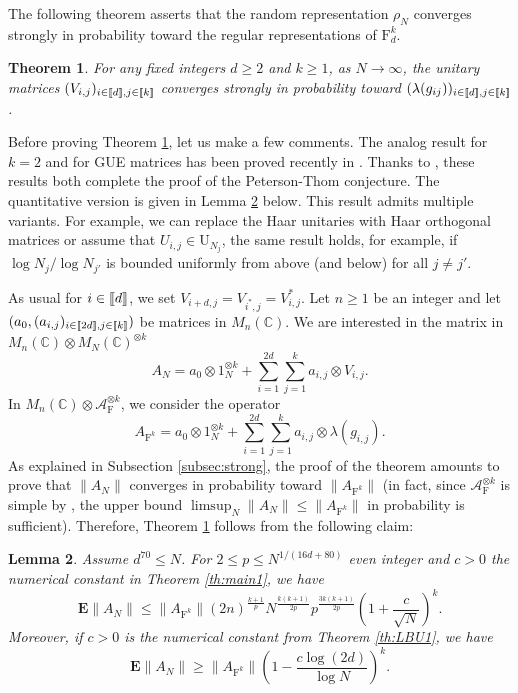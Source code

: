 \documentclass[11pt]{article}
\renewcommand{\star}{{\mathrm{F}}}
\newtheorem{lemma}{Lemma}[section]
\newtheorem{theorem}[lemma]{Theorem}
\newcommand{\cA}{\mathcal{A}}
\newcommand{\dE}{\mathbf {E}}
\newcommand{\dF}{\mathrm{F}}
\newcommand{\dU}{\mathrm {U}}
\newcommand{\dC}{\mathbb {C}}
\newcommand{\PAR}[1]{{{\left(#1\right)}}} %
\newcommand{\1}{1\!\!{\sf I}}
\newcommand{\INT}[1]{{{\left[\hspace{-1.4pt}\left[#1\right]\hspace{-1.4pt}\right]}}}
\begin{document}
The following theorem asserts that the random representation $\rho_N$ converges strongly in probability toward the regular representations of $\dF_d^k$. 
\begin{theorem}\label{th:PTH}
For any fixed integers $d \geq 2$ and $k \geq 1$, as $N\to \infty$, the unitary matrices $(V_{i,j})_{i \in \INT{d}, j \in \INT{k}}$ converges strongly in probability toward $(\lambda(g_{ij}))_{i \in \INT{d}, j \in \INT{k}}$.
\end{theorem}
Before proving Theorem \ref{th:PTH}, let us make a few comments. The analog result for $k= 2$ and for GUE matrices has been proved recently in \cite{belinschi2022strong}. Thanks to \cite{MR4448584}, these results both complete the proof of the Peterson-Thom conjecture. The quantitative version is given in Lemma \ref{le:PTq} below. This result admits multiple variants. For example, we can replace the Haar unitaries with Haar orthogonal matrices or assume that $U_{i,j} \in \dU_{N_j}$, the same result holds, for example, if $\log N_j / \log N_{j'}$ is bounded uniformly from above (and below) for all $j\ne j'$.
 
 
 As usual for $i \in \INT{d}$, we set $V_{i+d,j}= V_{i^*,j} = V_{i,j}^*$. Let $n \geq 1$ be an integer and let $(a_0,(a_{i,j})_{i \in \INT{2d}, j \in \INT{k}})$ be matrices in $M_n(\dC)$. We are interested in the matrix in $M_n (\dC) \otimes M_N(\dC)^{\otimes k}$
\begin{equation*}
A_N = a_0 \otimes 1_N^{\otimes k}  + \sum_{i=1}^{2d} \sum_{j=1}^k a_{i,j} \otimes V_{i,j}.
\end{equation*}
In $M_n(\dC) \otimes \cA_\star^{\otimes k}$, we consider the operator 
\begin{equation}\label{eq:defA*PT}
A_{\star^k} = a_0 \otimes 1_N^{\otimes k}  + \sum_{i=1}^{2d} \sum_{j=1}^k a_{i,j} \otimes \lambda(g_{i,j}).
\end{equation}
As explained in Subsection \ref{subsec:strong}, the proof of the theorem amounts to prove that $\|A_N\|$ converges in probability toward $\|A_{\star^k}\|$ (in fact,  since $\cA^{\otimes k}_\star$ is simple by \cite{MR374334}, the upper bound $\limsup_N \|A_N\| \leq \|A_{\star^k}\|$ in probability is sufficient). Therefore, Theorem \ref{th:PTH} follows from the following claim: 

\begin{lemma}\label{le:PTq} Assume $d^{70} \leq N$. For $2 \leq p \leq  N^{1/(16d + 80)}$ even integer and $c >0$ the numerical constant in Theorem \ref{th:main1}, we have
\begin{equation*}\label{eq:PTq}
  \dE \|A_{N} \|  \leq   \| A _{\star^k} \| (2n)^{\frac{k+1}{p}} N^{\frac{k(k+1)}{2p} } p^{\frac{3k(k+1)}{2p}}\PAR{ 1 + \frac{c}{\sqrt  N}}^k.
\end{equation*}
Moreover, if $c >0$ is the numerical constant from Theorem \ref{th:LBU1}, we have 
\begin{equation*} 
  \dE \|A_{N} \|  \geq  \| A _{\star^k} \| \PAR{ 1 - \frac{c \log (2d)}{\log N}}^k.
\end{equation*}
\end{lemma}
\end{document}
